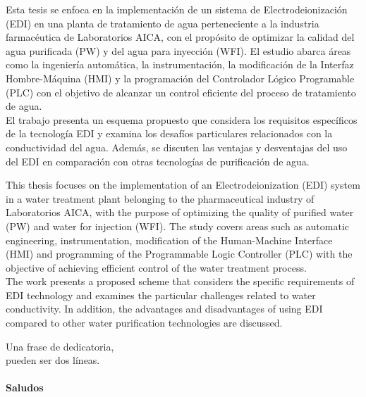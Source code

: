 \documentclass[
	spanish, %
	letterpaper, oneside
]{book}
\begin{document}
\templatePortrait

\templatePagecfg

\begin{abstractd}
	
Esta tesis se enfoca en la implementación de un sistema de Electrodeionización (EDI) en una planta de tratamiento de agua perteneciente a la industria farmacéutica de Laboratorios AICA, con el propósito de optimizar la calidad del agua purificada (PW) y del agua para inyección (WFI). El estudio abarca áreas como la ingeniería automática, la instrumentación, la modificación de la Interfaz Hombre-Máquina (HMI) y la programación del Controlador Lógico Programable (PLC) con el objetivo de alcanzar un control eficiente del proceso de tratamiento de agua.\\

El trabajo presenta un esquema propuesto que considera los requisitos específicos de la tecnología EDI y examina los desafíos particulares relacionados con la conductividad del agua. Además, se discuten las ventajas y desventajas del uso del EDI en comparación con otras tecnologías de purificación de agua.\\
\end{abstractd}

\newpage

\begin{abstractd}
	
This thesis focuses on the implementation of an Electrodeionization (EDI) system in a water treatment plant belonging to the pharmaceutical industry of Laboratorios AICA, with the purpose of optimizing the quality of purified water (PW) and water for injection (WFI). The study covers areas such as automatic engineering, instrumentation, modification of the Human-Machine Interface (HMI) and programming of the Programmable Logic Controller (PLC) with the objective of achieving efficient control of the water treatment process.\\
   
The work presents a proposed scheme that considers the specific requirements of EDI technology and examines the particular challenges related to water conductivity. In addition, the advantages and disadvantages of using EDI compared to other water purification technologies are discussed.\\
	\end{abstractd}

\begin{dedicatory}
	Una frase de dedicatoria, \\
	pueden ser dos líneas. \\
	~ \\
	\textbf{Saludos}
\end{dedicatory}
\end{document}
